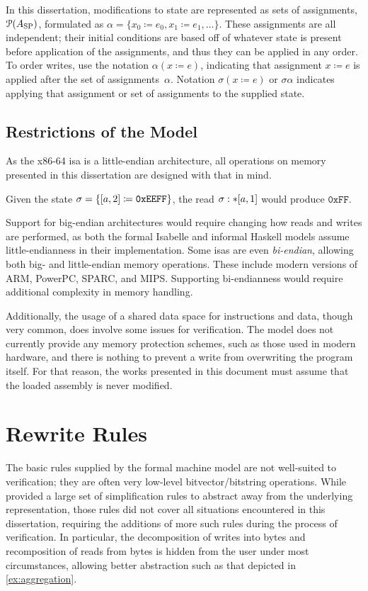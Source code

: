 In this dissertation,
modifications to state are represented as sets of assignments,~$\operatorname{\mathcal P}(A_\mathrm{SP})$,
formulated as $\alpha=\{x_0\coloneqq e_0,x_1\coloneqq e_1,\dotsc\}$.
These assignments are all independent; their initial conditions
are based off of whatever state is present before application of the assignments,
and thus they can be applied in any order.
To order writes, use the notation $\alpha(x\coloneqq e)$,
indicating that assignment $x\coloneqq e$ is applied
after the set of assignments~$\alpha$.
Notation $\sigma(x\coloneqq e)$ or $\sigma\alpha$ indicates applying that assignment
or set of assignments to the supplied state.

\subsection{Restrictions of the Model}
As the x86-64 \ac{isa} is a little-endian architecture,%
all operations on memory presented in this dissertation
are designed with that in mind.
\begin{example}
  Given the state $\sigma=\{[a,2]\coloneqq\mathtt{0xEEFF}\}$,
  the read $\sigma:\ast[a,1]$ would produce $\mathtt{0xFF}$.
\end{example}
Support for big-endian architectures would require changing how reads and writes%
are performed, as both the formal Isabelle and informal Haskell models
assume little-endianness in their implementation.
Some \acp{isa} are even \emph{bi-endian}, allowing both big- and little-endian%
memory operations. These include modern versions of ARM, PowerPC, SPARC, and MIPS.
Supporting bi-endianness would require additional complexity in memory handling.

Additionally,
the usage of a shared data space for instructions and data, though very common,
does involve some issues for verification.
The model does not currently provide any memory protection schemes,%
such as those used in modern hardware,
and there is nothing to prevent a write from overwriting the program itself.
For that reason, the works presented in this document must assume that the loaded assembly
is never modified.

\section{Rewrite Rules}\label{se:rewrite}
The basic rules supplied by the formal machine model are not well-suited to verification;
they are often very low-level bitvector/bitstring operations.
While \textcite{roessle2019} provided a large set of simplification rules
to abstract away from the underlying representation,
those rules did not cover all situations encountered in this dissertation,
requiring the additions of more such rules during the process of verification.
In particular, the decomposition of writes into bytes
and recomposition of reads from bytes is hidden from the user under most circumstances,
allowing better abstraction such as that depicted in \cref{ex:aggregation}.

